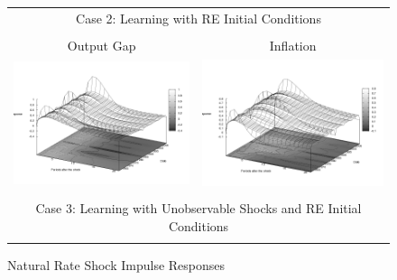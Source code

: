 \begin{figure}
\caption{Natural Rate Shock Impulse Responses}\label{fg:irf_nat}
\vspace*{1pc}
\begin{tabular}{cc}
\multicolumn{2}{c}{Case 2: Learning with RE Initial Conditions}\\ \\
Output Gap & Inflation \\ 
\includegraphics[scale=0.25]{results_reallinit/Output_natshock_irf3d.png} & 
\includegraphics[scale=0.25]{results_reallinit/Inflation_natshock_irf3d.png} \\ \\ 
\multicolumn{2}{c}{Case 3: Learning with Unobservable Shocks and RE Initial Conditions}\\ \\

\end{tabular}
\end{figure}

